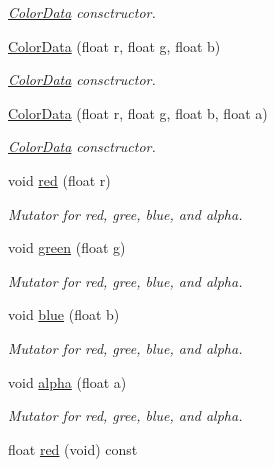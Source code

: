 \begin{DoxyCompactItemize}
\begin{DoxyCompactList}\small\item\em \hyperlink{classimage__tools_1_1ColorData}{Color\+Data} consctructor. \end{DoxyCompactList}\item 
\hyperlink{classimage__tools_1_1ColorData_ad64a66f681d0e502c2416e0bfcb86d14}{Color\+Data} (float r, float g, float b)
\begin{DoxyCompactList}\small\item\em \hyperlink{classimage__tools_1_1ColorData}{Color\+Data} consctructor. \end{DoxyCompactList}\item 
\hyperlink{classimage__tools_1_1ColorData_a20782ba5f82e73e731b87311da1bcd56}{Color\+Data} (float r, float g, float b, float a)
\begin{DoxyCompactList}\small\item\em \hyperlink{classimage__tools_1_1ColorData}{Color\+Data} consctructor. \end{DoxyCompactList}\item 
void \hyperlink{classimage__tools_1_1ColorData_a36d30e0a43563d120ec3533b878a7558}{red} (float r)
\begin{DoxyCompactList}\small\item\em Mutator for red, gree, blue, and alpha. \end{DoxyCompactList}\item 
void \hyperlink{classimage__tools_1_1ColorData_aaea99320f199dbdb36b87c82b8b5697d}{green} (float g)
\begin{DoxyCompactList}\small\item\em Mutator for red, gree, blue, and alpha. \end{DoxyCompactList}\item 
void \hyperlink{classimage__tools_1_1ColorData_ab9a4b4f7d983967c1c4105f9df1a60a8}{blue} (float b)
\begin{DoxyCompactList}\small\item\em Mutator for red, gree, blue, and alpha. \end{DoxyCompactList}\item 
void \hyperlink{classimage__tools_1_1ColorData_ad71793a20e4b2f654379ee79938b5ed2}{alpha} (float a)
\begin{DoxyCompactList}\small\item\em Mutator for red, gree, blue, and alpha. \end{DoxyCompactList}\item 
float \hyperlink{classimage__tools_1_1ColorData_a04fece12dab6d561a8fe5ac12f1c410d}{red} (void) const 

\end{DoxyCompactItemize}
